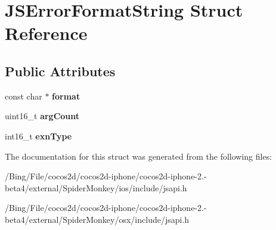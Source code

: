 \hypertarget{struct_j_s_error_format_string}{\section{J\-S\-Error\-Format\-String Struct Reference}
\label{struct_j_s_error_format_string}
}
\subsection*{Public Attributes}
\begin{DoxyCompactItemize}
\item 
\hypertarget{struct_j_s_error_format_string_a5dc64d62918c19e389b9854bbf6d1b6f}{const char $\ast$ {\bfseries format}}\label{struct_j_s_error_format_string_a5dc64d62918c19e389b9854bbf6d1b6f}

\item 
\hypertarget{struct_j_s_error_format_string_a083d096ea6663657475aecbea938bb7f}{uint16\-\_\-t {\bfseries arg\-Count}}\label{struct_j_s_error_format_string_a083d096ea6663657475aecbea938bb7f}

\item 
\hypertarget{struct_j_s_error_format_string_a396613aaef340caadedc7e2507425a91}{int16\-\_\-t {\bfseries exn\-Type}}\label{struct_j_s_error_format_string_a396613aaef340caadedc7e2507425a91}

\end{DoxyCompactItemize}


The documentation for this struct was generated from the following files\-:\begin{DoxyCompactItemize}
\item 
/\-Bing/\-File/cocos2d/cocos2d-\/iphone/cocos2d-\/iphone-\/2.-\/beta4/external/\-Spider\-Monkey/ios/include/jsapi.\-h\item 
/\-Bing/\-File/cocos2d/cocos2d-\/iphone/cocos2d-\/iphone-\/2.-\/beta4/external/\-Spider\-Monkey/osx/include/jsapi.\-h\end{DoxyCompactItemize}
